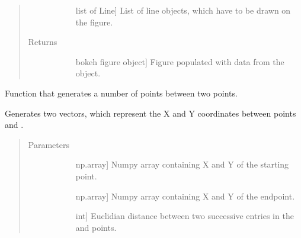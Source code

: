 \documentclass[letterpaper,10pt,english,openany,oneside]{sphinxmanual}
\begin{document}
\begin{fulllineitems}
\begin{fulllineitems}
\begin{quote}
\begin{description}
\begin{description}
\item[{}] \leavevmode{[}list of Line{]}
List of line objects, which have to be drawn on the figure.

\end{description}

\item[{Returns}] \leavevmode\begin{description}
\item[{}] \leavevmode{[}bokeh figure object{]}
Figure populated with data from the  object.

\end{description}

\end{description}\end{quote}

\end{fulllineitems}


\begin{fulllineitems}
\label{\detokenize{reference:cnc.visualization.Visualizer.split_line}}
Function that generates a number of points between two points.

Generates two vectors, which represent the X and Y coordinates between
points  and .
\begin{quote}\begin{description}
\item[{Parameters}] \leavevmode\begin{description}
\item[{}] \leavevmode{[}np.array{]}
Numpy array containing X and Y of the starting point.

\item[{}] \leavevmode{[}np.array{]}
Numpy array containing X and Y of the endpoint.

\item[{}] \leavevmode{[}int{]}
Euclidian distance between two successive entries in the 
and  points.

\end{description}


\end{description}
\end{quote}
\end{fulllineitems}
\end{fulllineitems}
\end{document}
